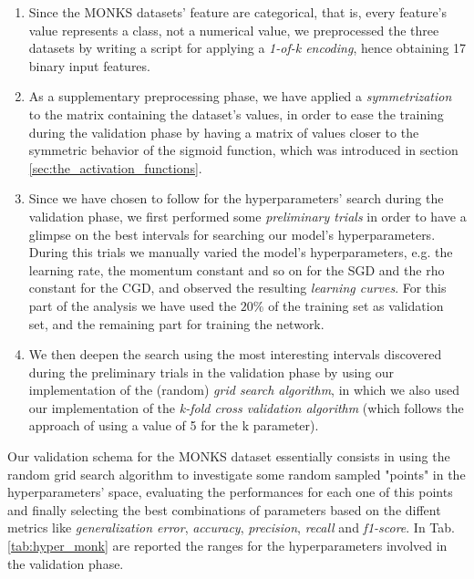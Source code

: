         \begin{enumerate}
            \item Since the MONKS datasets’ feature are categorical, that is, every feature’s value represents
            a class, not a numerical value, we preprocessed the three datasets by writing a script
            for applying a \textit{1-of-k encoding}, hence obtaining 17 binary input features.
            \item As a supplementary preprocessing phase, we have applied a \textit{symmetrization} to the
            matrix containing the dataset’s values, in order to ease the training during the validation phase
            by having a matrix of values closer to the symmetric behavior of the sigmoid function, which was
            introduced in section \ref{sec:the_activation_functions}.
            \item Since we have chosen to follow \cite{Bergstra:2012:RSH:2188385.2188395} for the
            hyperparameters' search during the validation phase, we first performed some
            \textit{preliminary trials} in order to have a glimpse on the best intervals for searching our
            model's hyperparameters. During this trials we manually varied the model's hyperparameters, e.g.
            the learning rate, the momentum constant and so on for the SGD and the rho constant for the CGD,
            and observed the resulting \textit{learning curves}. For this part of the analysis we have used
            the $20\%$ of the training set as validation set, and the remaining part for training the network.
            \item We then deepen the search using the most interesting intervals discovered during the
            preliminary trials in the validation phase by using our implementation of the (random)
            \textit{grid search algorithm}, in which we also used our implementation of the
            \textit{k-fold cross validation algorithm} (which follows the approach of using a value
            of 5 for the k parameter).
        \end{enumerate}

        Our validation schema for the MONKS dataset essentially consists in using the random grid
        search algorithm to investigate some random sampled "points" in the hyperparameters' space, evaluating
        the performances for each one of this points and finally selecting the best combinations of parameters
        based on the diffent metrics like \textit{generalization error}, \textit{accuracy}, \textit{precision},
        \textit{recall} and \textit{f1-score}. In Tab. \ref{tab:hyper_monk} are reported the ranges for the
        hyperparameters involved in the validation phase.

